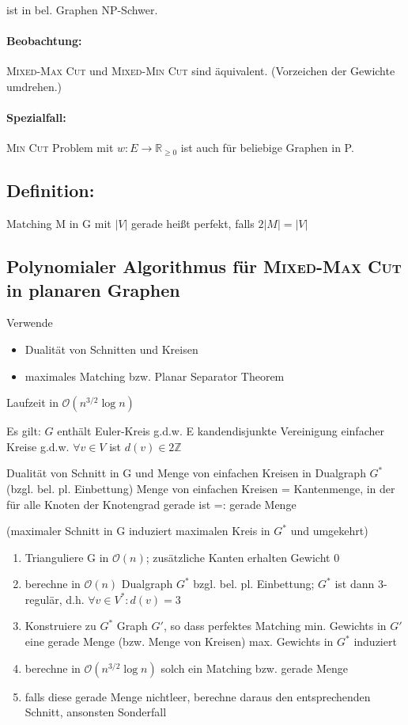 \documentclass{article}
\newcommand{\Z}{\mathbb{Z}}
\renewcommand{\O}[1]{\mathcal{O}\left(#1\right)}
\newcommand{\R}{\mathbb{R}}
\begin{document}
ist in bel. Graphen NP-Schwer.

\paragraph{Beobachtung:}
\textsc{Mixed-Max Cut} und \textsc{Mixed-Min Cut} sind äquivalent. (Vorzeichen der Gewichte umdrehen.)

\paragraph{Spezialfall:} \textsc{Min Cut} Problem mit $w:E\rightarrow \R_{\geq 0}$ ist auch für beliebige Graphen in P.

\subsection{Definition:}
Matching M in G mit $|V|$ gerade heißt perfekt, falls $2|M| = |V|$

\subsection{Polynomialer Algorithmus für \textsc{Mixed-Max Cut} in planaren Graphen}
Verwende 
\begin{itemize}
	\item Dualität von Schnitten und Kreisen
	\item maximales Matching bzw. Planar Separator Theorem
\end{itemize}
Laufzeit in $\O{n^{3/2}\log n}$


Es gilt: $G$ enthält Euler-Kreis g.d.w. E kandendisjunkte Vereinigung einfacher Kreise g.d.w. $\forall v\in V$ ist $d(v) \in 2\Z$


Dualität von Schnitt in G und Menge von einfachen Kreisen in Dualgraph $G^*$ (bzgl. bel. pl. Einbettung)
Menge von einfachen Kreisen = Kantenmenge, in der für alle Knoten der Knotengrad gerade ist =: gerade Menge

(maximaler Schnitt in G induziert maximalen Kreis in $G^*$ und umgekehrt)

\begin{enumerate}
	\item Trianguliere G in $\O{n}$; zusätzliche Kanten erhalten Gewicht 0
	\item berechne in $\O{n}$ Dualgraph $G^*$ bzgl. bel. pl. Einbettung; $G^*$ ist dann 3-regulär, d.h. $\forall v \in V^*: d(v) = 3$
	\item Konstruiere zu $G^*$ Graph $G'$, so dass perfektes Matching min. Gewichts in $G'$ eine gerade Menge (bzw. Menge von Kreisen) max. Gewichts in $G^*$ induziert
	\item berechne in $\O{n^{3/2}\log n}$ solch ein Matching bzw. gerade Menge
	\item falls diese gerade Menge nichtleer, berechne daraus den entsprechenden Schnitt, ansonsten Sonderfall
\end{enumerate}
\end{document}
